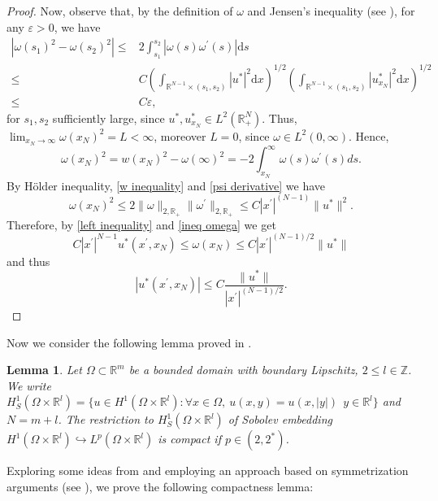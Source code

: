 \documentclass[12pt,reqno]{amsart}
\newtheorem{lemma}[theorem]{Lemma}
\begin{document}
\begin{proof}
        
		Now, observe that, by the definition of $\omega$ and Jensen's inequality (see \cite[Theorem 3.3]{Rudin}), for any $\varepsilon>0$, we have
        \begin{align*}
            |\omega(s_1)^2-\omega(s_2)^2|\leq& 2\int_{s_1}^{s_2}|\omega(s)\omega^\prime(s)|\mathrm{d}s\\
            \leq& C \left(\int_{\mathds{R}^{N-1}\times (s_1,s_2)}|u^\ast|^2\mathrm{d}x\right)^{1/2}\left(\int_{\mathds{R}^{N-1}\times (s_1,s_2)}|u^\ast_{x_N}|^2\mathrm{d}x\right)^{1/2}\\
            \leq& C\varepsilon,
        \end{align*}
for $s_1,s_2$ sufficiently large, since $u^\ast, u^\ast_{x_N}\in L^2(\mathds{R}^N_+)$. Thus, $\lim_{x_N\longrightarrow \infty}\omega(x_N)^2=L<\infty$, moreover $L=0$, since $\omega \in L^2(0,\infty)$.
Hence,        
		\[
		\omega(x_N)^2=w(x_N)^2-	\omega(\infty)^2=-2\int_{x_N}^{\infty}\omega(s)\omega^\prime(s)ds.
		\]
By Hölder inequality, \eqref{w inequality} and \eqref{psi derivative} we have
		\begin{equation}\label{ineq omega}
			\omega(x_N)^2\leq 2\|\omega\|_{2,\mathds{R}_+}\|\omega^\prime\|_{2,\mathds{R}_+}
			\leq C|x^\prime|^{(N-1)}\|u^\ast\|^2.
		\end{equation}
		Therefore, by \eqref{left inequality} and \eqref{ineq omega} we get
\begin{equation*}
    C|x^\prime|^{N-1}u^\ast(x^\prime,x_N)\leq \omega(x_N)\leq C|x^\prime|^{(N-1)/2}\|u^\ast\|
\end{equation*}
and thus
\[
|u^\ast(x^\prime,x_N)|\leq C \frac{\|u^\ast\|}{|x^\prime|^{(N-1)/2}}.
\]
\end{proof}


Now we consider the following lemma proved in \cite{PLLions}.
\begin{lemma}\label{Lions} Let $\Omega\subset \mathds{R}^m$ be a bounded domain with boundary Lipschitz, $2\leq l\in \mathds{Z}$. We write $H^1_S(\Omega\times\mathds{R}^l )=\{u\in H^1(\Omega\times \mathds{R}^l): \forall x \in \Omega,~u(x,y)=u(x,|y|)~~\text{$y\in \mathds{R}^l$}\}$ and $N=m+l$. The restriction to $H^1_S(\Omega\times \mathds{R}^l)$ of Sobolev embedding  $H^1(\Omega\times \mathds{R}^l)\hookrightarrow L^p(\Omega\times \mathds{R}^l)$ is compact if $p\in(2,2^\ast)$.
\end{lemma}

Exploring some ideas from \cite{Claudianor-Angelo} and employing an approach based on symmetrization arguments (see \cite{PLLions}), we prove the following compactness lemma: 
\end{document}
